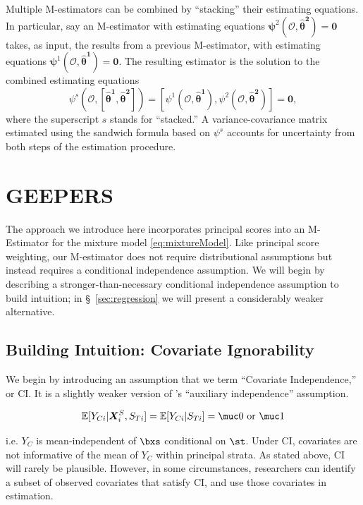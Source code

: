 \documentclass[]{article}
\begin{document}
Multiple M-estimators can be combined by ``stacking'' their estimating equations.
In particular, say an M-estimator with estimating equations $\bm{\psi}^2(\bm{\mathcal{O}},\bm{\hat\theta^2})=\bm{0}$ takes, as input, the results from a previous M-estimator, with estimating equations $\bm{\psi}^1(\bm{\mathcal{O}},\bm{\hat\theta^1})=\bm{0}$.
The resulting estimator is the solution to the combined estimating equations
\begin{equation}\label{eq:stacked}
  \psi^s(\bm{\mathcal{O}},[\bm{\hat\theta^1},\bm{\hat{\theta}^2}])=[\psi^1(\bm{\mathcal{O}},\bm{\hat\theta^1}),\psi^2(\bm{\mathcal{O}},\bm{\hat\theta^2})]=\bm{0},
\end{equation}
where the superscript $s$ stands for ``stacked.''
A variance-covariance matrix estimated using the sandwich formula based on $\psi^s$ accounts for uncertainty from both steps of the estimation procedure. 



\section{GEEPERS }\label{sec:geepers}

The approach we introduce here incorporates principal scores into an M-Estimator for the mixture model \eqref{eq:mixtureModel}.
Like principal score weighting, our M-estimator does not require distributional assumptions but instead requires a conditional independence assumption.
We will begin by describing a stronger-than-necessary conditional independence assumption to build intuition; in \S~\ref{sec:regression} we will present a considerably weaker alternative.

\subsection{Building Intuition: Covariate Ignorability}\label{sec:ci}

We begin by introducing an assumption that we term ``Covariate Independence,'' or CI. It is a slightly weaker version of \citet{jiangDing2021}'s ``auxiliary independence'' assumption.
\begin{ass}\label{ass:ci}
\begin{equation}\label{eq:assumption}
\EE[\yci|\bxsi,\sti]=\EE[\yci|\sti]=\muc0\text{ or }\muc1
\end{equation}
\end{ass}
i.e. $Y_C$ is mean-independent of $\bxs$ conditional on $\st$.
Under CI, covariates are not informative of the mean of $Y_C$ within principal strata.
As stated above, CI will rarely be plausible.
However, in some circumstances, researchers can identify a subset of observed covariates that satisfy CI, and use those covariates in estimation.
\end{document}
